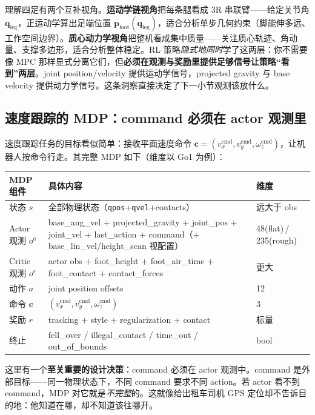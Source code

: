 \begin{insight}[策略隐式地同时做运动学与动力学控制]\label{ins:rlmc-ql-kindyn}
理解四足有两个互补视角。\textbf{运动学链视角}把每条腿看成 3R 串联臂——给定关节角 $\mathbf{q}_{\text{leg}}$，正运动学算出足端位置 $\mathbf{p}_{\text{foot}}(\mathbf{q}_{\text{leg}})$，适合分析单步几何约束（脚能伸多远、工作空间边界）。\textbf{质心动力学视角}把整机看成集中质量——关注质心轨迹、角动量、支撑多边形，适合分析整体稳定。RL 策略\emph{隐式地同时}学了这两层：你不需要像 MPC 那样显式分离它们，但\textbf{必须在观测与奖励里提供足够信号让策略“看到”两层}。joint position/velocity 提供运动学信号，projected gravity 与 base velocity 提供动力学信号。这条洞察直接决定了下一小节观测该放什么。
\end{insight}

\subsection{速度跟踪的 MDP：command 必须在 actor 观测里}
\label{sec:rlmc-ql-mdp-def}

速度跟踪任务的目标看似简单：接收平面速度命令 $\mathbf{c}=(v_x^{\text{cmd}}, v_y^{\text{cmd}}, \omega_z^{\text{cmd}})$，让机器人按命令行走。其完整 MDP 如下（维度以 Go1 为例）：

\begin{center}
\small
\begin{tabular}{@{}lll@{}}
\toprule
MDP 组件 & 具体内容 & 维度 \\
\midrule
状态 $s$ & 全部物理状态（\texttt{qpos}+\texttt{qvel}+contacts） & 远大于 obs \\
Actor 观测 $o^a$ & base\_ang\_vel + projected\_gravity + joint\_pos + joint\_vel + last\_action + command（+ base\_lin\_vel/height\_scan 视配置） & 48(flat)\,/\,235(rough) \\
Critic 观测 $o^c$ & actor obs + foot\_height + foot\_air\_time + foot\_contact + contact\_forces & 更大 \\
动作 $a$ & joint position offsets & 12 \\
命令 $\mathbf{c}$ & $(v_x^{\text{cmd}}, v_y^{\text{cmd}}, \omega_z^{\text{cmd}})$ & 3 \\
奖励 $r$ & tracking + style + regularization + contact & 标量 \\
终止 & fell\_over / illegal\_contact / time\_out / out\_of\_bounds & bool \\
\bottomrule
\end{tabular}
\end{center}

这里有一个\textbf{至关重要的设计决策}：command 必须在 actor 观测中。command 是外部目标——同一物理状态下，不同 command 要求不同 action。若 actor 看不到 command，MDP 对它就是\emph{不完整}的。这就像给出租车司机 GPS 定位却不告诉目的地：他知道在哪，却不知道该往哪开。

